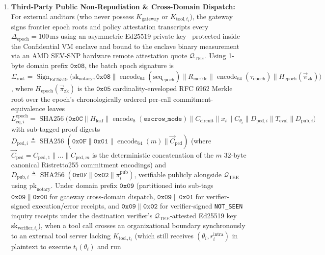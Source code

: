 \documentclass[conference,10pt]{IEEEtran}
\begin{document}
\begin{enumerate}
\begin{equation}
\begin{split}
    &\parallel \operatorname{SHA256}(\mathtt{0x0D} \parallel \operatorname{encode}(\vec{\pi}_{\text{zk}})) \\
    &\parallel \operatorname{SHA256}(\mathtt{0x0E} \parallel \operatorname{encode}(\mathcal{M}_{\text{path}})) \\
    &\parallel \operatorname{lp}(\text{kid}_{\text{notary}}) \parallel \text{pk}_{\text{notary}}\Big)
    \end{split}
    \end{equation}
    \item \textbf{Third-Party Public Non-Repudiation \& Cross-Domain Dispatch:} For external auditors (who never possess $K_{\text{gateway}}$ or $K_{\text{tool}, t_i}$), the gateway signs frontier epoch roots and policy attestation transcripts every $\Delta_{\text{epoch}} = 100\,\text{ms}$ using an asymmetric Ed25519 private key~\cite{bernstein2012ed25519} protected inside the Confidential VM enclave and bound to the enclave binary measurement via an AMD SEV-SNP hardware remote attestation quote $\mathcal{Q}_{\text{TEE}}$. Using 1-byte domain prefix $\mathtt{0x08}$, the batch epoch signature is $\Sigma_{\text{root}} = \operatorname{Sign}_{\text{Ed25519}}\big(\text{sk}_{\text{notary}}, \mathtt{0x08} \parallel \operatorname{encode}_{64}(\text{seq}_{\text{epoch}}) \parallel R_{\text{merkle}} \parallel \operatorname{encode}_{64}(\tau_{\text{epoch}}) \parallel H_{\text{epoch}}(\vec{\pi}_{\text{zk}})\big)$, where $H_{\text{epoch}}(\vec{\pi}_{\text{zk}})$ is the $\mathtt{0x05}$ cardinality-enveloped RFC 6962 Merkle root over the epoch's chronologically ordered per-call commitment-equivalence leaves $L_{\text{eq}, i}^{\text{epoch}} = \operatorname{SHA256}\big(\mathtt{0x0C} \parallel H_{\text{leaf}} \parallel \operatorname{encode}_8(\texttt{escrow\_mode}) \parallel C_{\text{circuit}} \parallel x_i \parallel C_{\theta_i} \parallel D_{\text{ped}, i} \parallel T_{\text{eval}} \parallel D_{\text{pub}, i}\big)$ with sub-tagged proof digests $D_{\text{ped}, i} \triangleq \operatorname{SHA256}(\mathtt{0x0F} \parallel \mathtt{0x01} \parallel \operatorname{encode}_{64}(m) \parallel \vec{C}_{\text{ped}})$ (where $\vec{C}_{\text{ped}} = C_{\text{ped}, 1} \parallel \dots \parallel C_{\text{ped}, m}$ is the deterministic concatenation of the $m$ 32-byte canonical Ristretto255 commitment encodings) and $D_{\text{pub}, i} \triangleq \operatorname{SHA256}(\mathtt{0x0F} \parallel \mathtt{0x02} \parallel \pi_i^{\text{pub}})$, verifiable publicly alongside $\mathcal{Q}_{\text{TEE}}$ using $\text{pk}_{\text{notary}}$. Under domain prefix $\mathtt{0x09}$ (partitioned into sub-tags $\mathtt{0x09} \parallel \mathtt{0x00}$ for gateway cross-domain dispatch, $\mathtt{0x09} \parallel \mathtt{0x01}$ for verifier-signed execution/error receipts, and $\mathtt{0x09} \parallel \mathtt{0x02}$ for verifier-signed \texttt{NOT\_SEEN} inquiry receipts under the destination verifier's $\mathcal{Q}_{\text{TEE}}$-attested Ed25519 key $\text{sk}_{\text{verifier}, t_i}$), when a tool call crosses an organizational boundary synchronously to an external tool server lacking $K_{\text{tool}, t_i}$ (which still receives $(\theta_i, r_i^{\text{intra}})$ in plaintext to execute $t_i(\theta_i)$ and run 
\end{enumerate}
\end{document}
